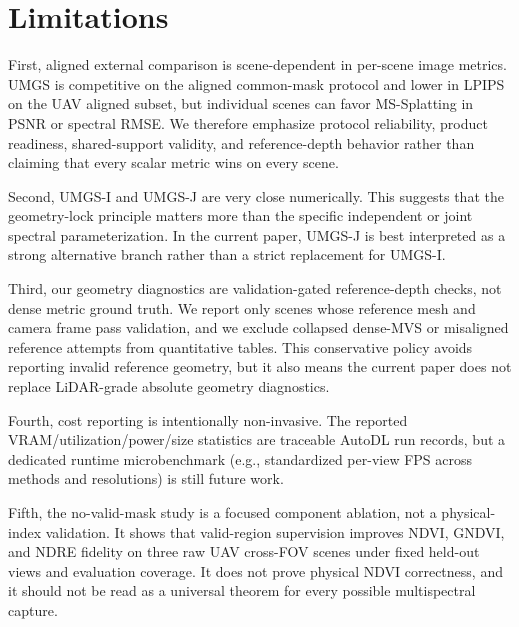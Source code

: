 ﻿\section{Limitations}

First, aligned external comparison is scene-dependent in per-scene image metrics. UMGS is competitive on the aligned common-mask protocol and lower in LPIPS on the UAV aligned subset, but individual scenes can favor MS-Splatting in PSNR or spectral RMSE. We therefore emphasize protocol reliability, product readiness, shared-support validity, and reference-depth behavior rather than claiming that every scalar metric wins on every scene.

Second, UMGS-I and UMGS-J are very close numerically. This suggests that the geometry-lock principle matters more than the specific independent or joint spectral parameterization. In the current paper, UMGS-J is best interpreted as a strong alternative branch rather than a strict replacement for UMGS-I.

Third, our geometry diagnostics are validation-gated reference-depth checks, not dense metric ground truth. We report only scenes whose reference mesh and camera frame pass validation, and we exclude collapsed dense-MVS or misaligned reference attempts from quantitative tables. This conservative policy avoids reporting invalid reference geometry, but it also means the current paper does not replace LiDAR-grade absolute geometry diagnostics.

Fourth, cost reporting is intentionally non-invasive. The reported VRAM/utilization/power/size statistics are traceable AutoDL run records, but a dedicated runtime microbenchmark (e.g., standardized per-view FPS across methods and resolutions) is still future work.

Fifth, the no-valid-mask study is a focused component ablation, not a physical-index validation. It shows that valid-region supervision improves NDVI, GNDVI, and NDRE fidelity on three raw UAV cross-FOV scenes under fixed held-out views and evaluation coverage. It does not prove physical NDVI correctness, and it should not be read as a universal theorem for every possible multispectral capture.
